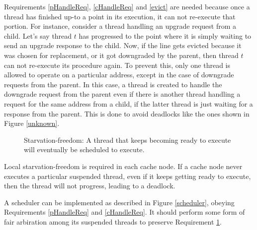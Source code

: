 Requirements \ref{pHandleReq}, \ref{cHandleReq} and \ref{evict} are needed
because once a thread has finished up-to a point in its execution, it can not
re-execute that portion. For instance, consider a thread handling an upgrade
request from a child. Let's say thread $t$ has progressed to the point where it
is simply waiting to send an upgrade response to the child. Now, if the line
gets evicted because it was chosen for replacement, or it got downgraded by the
parent, then thread $t$ can not re-execute its procedure again. To prevent this,
only one thread is allowed to operate on a particular address, except in the
case of downgrade requests from the parent. In this case, a thread is created to
handle the downgrade request from the parent even if there is another thread
handling a request for the same address from a child, if the latter thread is
just waiting for a response from the parent. This is done to avoid deadlocks
like the ones shown in Figure \ref{unknown}.

\begin{figure}\small
\begin{requirement}
Starvation-freedom: A thread that keeps becoming ready to execute will
eventually be scheduled to execute.\label{starvation}
\end{requirement}
\end{figure}

Local starvation-freedom is required in each cache node. If a cache node never
executes a particular suspended thread, even if it keeps getting ready to
execute, then the thread will not progress, leading to a deadlock.

A scheduler can be implemented as described in Figure \ref{scheduler}, obeying
Requirements \ref{pHandleReq} and \ref{cHandleReq}. It should perform some form of
fair arbiration among its suspended threads to preserve Requirement
\ref{starvation}.

\newcommand{\lWhile}{\textbf{while}}
\newcommand{\lIf}{\textbf{if}}
\newcommand{\lElsIf}{\textbf{else if}}
\newcommand{\lElse}{\textbf{else}}


